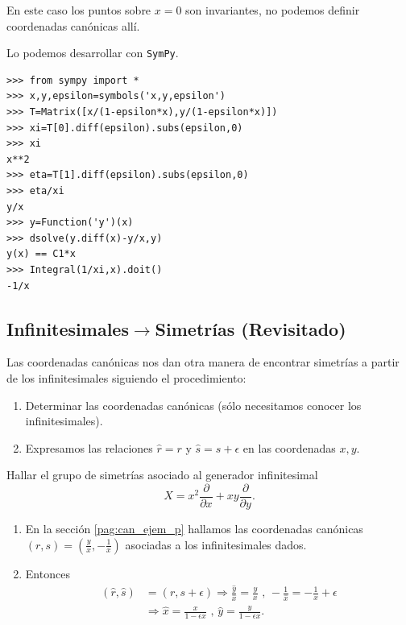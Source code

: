 En este caso los puntos sobre $x=0$ son invariantes, no podemos definir coordenadas canónicas allí.

Lo podemos desarrollar con \texttt{SymPy}. 
\begin{lstlisting}
>>> from sympy import *
>>> x,y,epsilon=symbols('x,y,epsilon')
>>> T=Matrix([x/(1-epsilon*x),y/(1-epsilon*x)])
>>> xi=T[0].diff(epsilon).subs(epsilon,0)
>>> xi
x**2
>>> eta=T[1].diff(epsilon).subs(epsilon,0)
>>> eta/xi
y/x
>>> y=Function('y')(x)
>>> dsolve(y.diff(x)-y/x,y)
y(x) == C1*x
>>> Integral(1/xi,x).doit()
-1/x

\end{lstlisting}




\subsection{Infinitesimales$\to$Simetrías (Revisitado)}
Las coordenadas canónicas nos dan otra manera de encontrar simetrías a partir de los infinitesimales siguiendo el procedimiento:

\begin{enumerate}
\item Determinar las coordenadas canónicas  (sólo necesitamos conocer los infinitesimales).
\item Expresamos las relaciones $\hat{r}=r$ y $\hat{s}=s+\epsilon$ en las coordenadas $x,y$.
\end{enumerate}


\begin{ejemplo} Hallar el grupo de simetrías asociado al generador infinitesimal
\[X=x^2\frac{\partial}{\partial x}+xy\frac{\partial}{\partial y}.\]
\end{ejemplo}


\begin{enumerate}
\item En la sección \ref{pag:can_ejem_p} hallamos las coordenadas canónicas $(r,s)=\left(\frac{y}{x},-\frac{1}{x}\right)$ asociadas a los infinitesimales dados.
\item Entonces
\[\begin{split}
(\hat{r},\hat{s})&=(r,s+\epsilon)\Rightarrow \frac{\hat{y}}{\hat{x}}=\frac{y}{x}\text{ , }-\frac{1}{\hat{x}}=-\frac{1}{x}+\epsilon\\
&\Rightarrow \hat{x}=\frac{x}{1-\epsilon x} \text{ , } \hat{y}=\frac{y}{1-\epsilon x}.
\end{split}
\] 
\end{enumerate}



